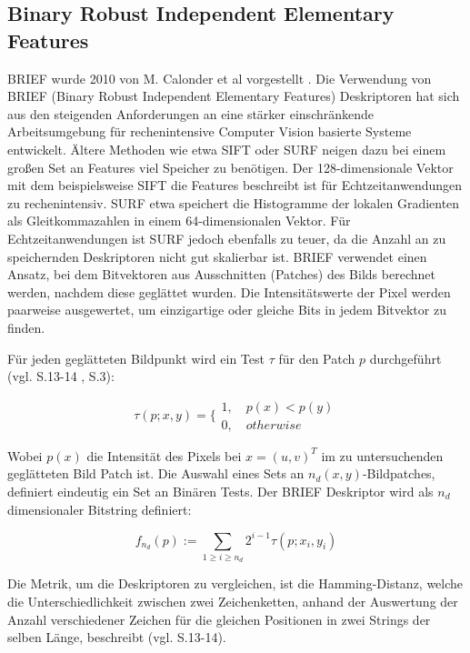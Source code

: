 \subsection{Binary Robust Independent Elementary Features}
BRIEF wurde 2010 von M. Calonder et al vorgestellt \cite{brief}. Die Verwendung von BRIEF (Binary Robust Independent Elementary Features) Deskriptoren hat sich aus den steigenden Anforderungen an eine stärker einschränkende Arbeitsumgebung für rechenintensive Computer Vision basierte Systeme entwickelt. Ältere Methoden wie etwa SIFT oder SURF neigen dazu bei einem großen Set an Features viel Speicher zu benötigen. Der 128-dimensionale Vektor mit dem beispielsweise SIFT die Features beschreibt ist für Echtzeitanwendungen zu rechenintensiv. SURF etwa speichert die Histogramme der lokalen Gradienten als Gleitkommazahlen in einem 64-dimensionalen Vektor. Für Echtzeitanwendungen ist SURF jedoch ebenfalls zu teuer, da die Anzahl an zu speichernden Deskriptoren nicht gut skalierbar ist. BRIEF verwendet einen Ansatz, bei dem Bitvektoren aus Ausschnitten (Patches) des Bilds berechnet werden, nachdem diese geglättet wurden. Die Intensitätswerte der Pixel werden paarweise ausgewertet, um einzigartige oder gleiche Bits in jedem Bitvektor zu finden. 

Für jeden geglätteten Bildpunkt wird ein Test $\tau$ für den Patch $p$ durchgeführt (vgl. \cite{orb_slam} S.13-14 , \cite{brief} S.3):

\begin{equation}
\tau(p;x,y)= \biggl\{ \begin{array}{ll}
         1, \quad p(x)<p(y)\\
        0, \quad otherwise\end{array}
\end{equation}

Wobei $p(x)$ die Intensität des Pixels bei $x=(u,v)^T$ im zu untersuchenden geglätteten Bild Patch ist. Die Auswahl eines Sets an $n_d (x,y)$-Bildpatches, definiert eindeutig ein Set an Binären Tests. Der BRIEF Deskriptor wird als $n_d$ dimensionaler Bitstring definiert:

\begin{equation}
f_{n_d}(p):= \sum_{1\geq i \geq n_d} 2^{i-1} \tau (p;x_i,y_i)
\end{equation}

Die Metrik, um die Deskriptoren zu vergleichen, ist die Hamming-Distanz, welche die Unterschiedlichkeit zwischen zwei Zeichenketten, anhand der Auswertung der Anzahl verschiedener Zeichen für die gleichen Positionen in zwei Strings der selben Länge, beschreibt (vgl. \cite{orb_slam} S.13-14).

